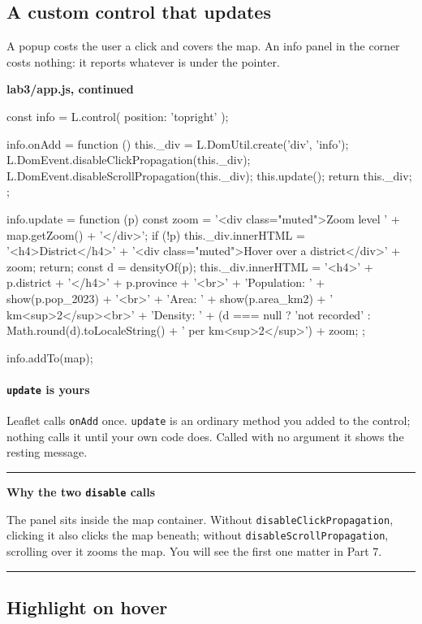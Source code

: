 \documentclass{article}
\newcommand{\cd}[1]{\texttt{#1}}
\newcommand{\codecap}[1]{%
  \par\vspace{.9em}\noindent\textbf{#1}\par\vspace{-.6em}}
\newenvironment{keypoint}[1]
  {\par\vspace{.7em}\noindent\rule{\linewidth}{.6pt}\par\vspace{.15em}
   \noindent\textbf{#1}\par\nobreak\vspace{-.3em}}
  {\par\vspace{.15em}\noindent\rule{\linewidth}{.6pt}\par\vspace{.7em}}
\begin{document}
\subsection{A custom control that updates}

A popup costs the user a click and covers the map. An info panel in the
corner costs nothing: it reports whatever is under the pointer.

\codecap{lab3/app.js, continued}
\begin{code}
const info = L.control({ position: 'topright' });

info.onAdd = function () {
  this._div = L.DomUtil.create('div', 'info');
  L.DomEvent.disableClickPropagation(this._div);
  L.DomEvent.disableScrollPropagation(this._div);
  this.update();
  return this._div;
};

info.update = function (p) {
  const zoom = '<div class="muted">Zoom level ' + map.getZoom() + '</div>';
  if (!p) {
    this._div.innerHTML = '<h4>District</h4>' +
      '<div class="muted">Hover over a district</div>' + zoom;
    return;
  }
  const d = densityOf(p);
  this._div.innerHTML =
    '<h4>' + p.district + '</h4>' +
    p.province + '<br>' +
    'Population: ' + show(p.pop_2023) + '<br>' +
    'Area: ' + show(p.area_km2) + ' km<sup>2</sup><br>' +
    'Density: ' + (d === null ? 'not recorded'
       : Math.round(d).toLocaleString() + ' per km<sup>2</sup>') +
    zoom;
};

info.addTo(map);
\end{code}

\paragraph{\texttt{update} is yours}
Leaflet calls \cd{onAdd} once. \cd{update} is an ordinary method you
added to the control; nothing calls it until your own code does. Called
with no argument it shows the resting message.

\begin{keypoint}{Why the two \texttt{disable} calls}
The panel sits inside the map container. Without
\cd{disableClickPropagation}, clicking it also clicks the map beneath;
without \cd{disableScrollPropagation}, scrolling over it zooms the map.
You will see the first one matter in Part 7.
\end{keypoint}

\subsection{Highlight on hover}
\end{document}
